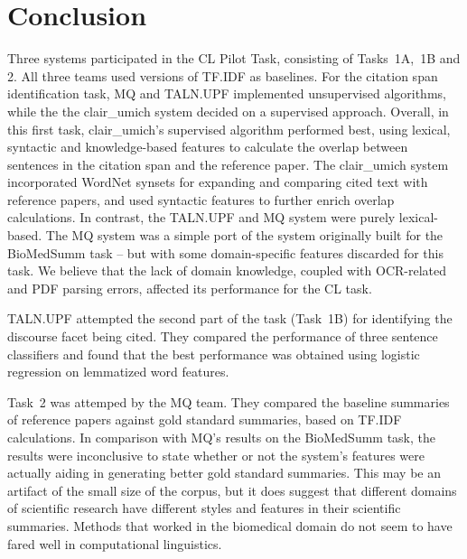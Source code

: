 \documentclass[11pt]{article}
\begin{document}
\section{Conclusion}
Three systems participated in the CL Pilot Task, consisting of
Tasks~1A,~1B and 2. All three teams used versions of TF.IDF as
baselines.  For the citation span identification task, MQ and TALN.UPF
implemented unsupervised algorithms, while the the clair\_umich system
decided on a supervised approach. Overall, in this first task,
clair\_umich's supervised algorithm performed best, using lexical,
syntactic and knowledge-based features to calculate the overlap
between sentences in the citation span and the reference paper.
The clair\_umich system incorporated WordNet synsets for expanding and
comparing cited text with reference papers, and used syntactic
features to further enrich overlap calculations. In contrast, the
TALN.UPF and MQ system were purely lexical-based. The MQ system was a
simple port of the system originally built for the BioMedSumm task --
but with some domain-specific features discarded for this task. We
believe that the lack of domain knowledge, coupled with OCR-related
and PDF parsing errors, affected its performance for the CL task.

TALN.UPF attempted the second part of the task (Task~1B) for
identifying the discourse facet being cited. They compared the
performance of three sentence classifiers and found that the best
performance was obtained using logistic regression on lemmatized word
features.

Task~2 was attemped by the MQ team.  They compared the baseline
summaries of reference papers against gold standard summaries, based
on TF.IDF calculations. In comparison with MQ's results on the
BioMedSumm task, the results were inconclusive to state whether or not
the system's features were actually aiding in generating better gold
standard summaries. This may be an artifact of the small size of the
corpus, but it does suggest that different domains of scientific
research have different styles and features in their scientific
summaries. Methods that worked in the biomedical domain do not seem to
have fared well in computational linguistics. \\
\end{document}
